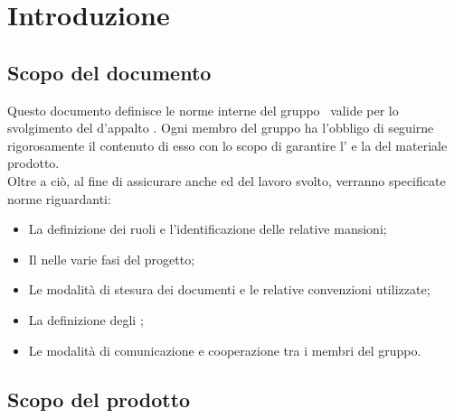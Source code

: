 \newpage
\section{Introduzione}

\subsection{Scopo del documento}
Questo documento definisce le norme interne del gruppo \gruppo\ valide per lo svolgimento del  d'appalto \progetto . Ogni membro del gruppo ha l'obbligo di seguirne rigorosamente il contenuto di esso con lo scopo di garantire l' e la   del materiale prodotto. \\
Oltre a ciò, al fine di assicurare anche  ed  del lavoro svolto, verranno specificate norme riguardanti:
\begin{itemize}
	\item La definizione dei ruoli e l'identificazione delle relative mansioni;	
	\item Il  nelle varie fasi del progetto;
	\item Le modalità di stesura dei documenti e le relative convenzioni utilizzate;
	\item La definizione degli ;
	\item Le modalità di comunicazione e cooperazione tra i membri del gruppo.
\end{itemize}

\subsection{Scopo del prodotto}
\scopoProdotto

